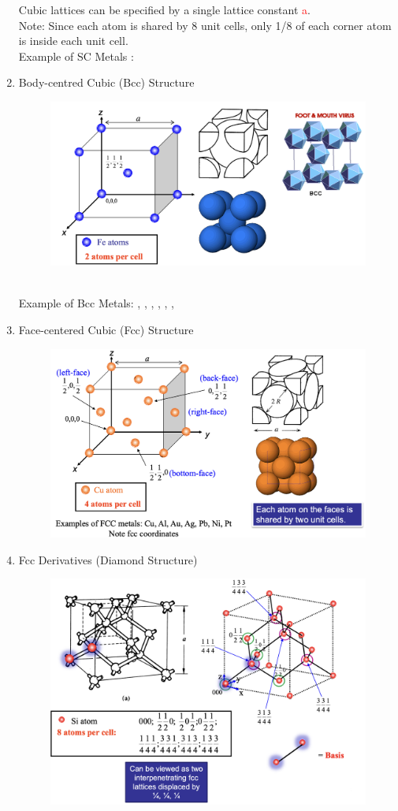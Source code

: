\begin{enumerate}
\begin{figure}[h]
    \end{figure}
    Cubic lattices can be specified by a single lattice constant \textcolor{red}{a}. \\
    Note: Since each atom is shared by 8 unit cells, only 1/8 of each corner atom is inside each unit cell. \\
    Example of SC Metals : 
    \item Body-centred Cubic (Bcc) Structure
    \begin{figure}[h]
        \centering
        \includegraphics[width=0.75\linewidth]{image/bcc.png}
    \end{figure} \\
    Example of Bcc Metals: , , , , , , 
    \newpage
    \item Face-centered Cubic (Fcc) Structure 
    \begin{figure}[h]
        \centering
        \includegraphics[width=0.75\linewidth]{image/fcc.png}
    \end{figure}
    \item Fcc Derivatives (Diamond Structure) 
    \begin{figure}[h]
        \centering
        \includegraphics[width=0.75\linewidth]{image/diamondsturc.png}

\end{figure}
\end{enumerate}
